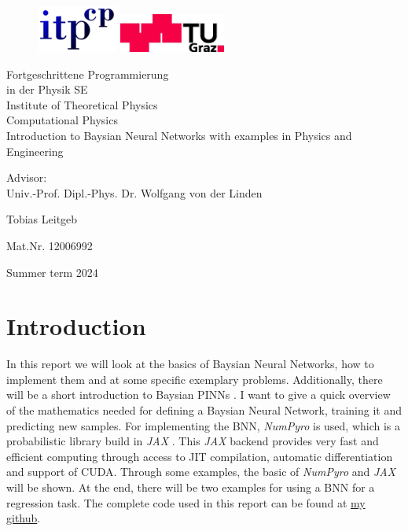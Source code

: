 \documentclass{article}
\newcommand{\bacc}{ Fortgeschrittene Programmierung \\ in der Physik SE}
\begin{document}
\begin{titlepage}
    \begin{figure}
    \includegraphics[width=3.cm]{logo-itp.png} \hfill
    \includegraphics[width=3.5cm]{logo-tu.png} \par
    \end{figure}
    
    \begin{center}
    {\huge\sc \bacc} \\ Institute of Theoretical Physics\\
    Computational Physics\\
    
    \vspace{5cm}
    {\huge\sc Introduction to Baysian Neural Networks with examples in Physics and Engineering} \par
    Advisor: \\ Univ.-Prof. Dipl.-Phys. Dr. Wolfgang von der Linden \\ 
    \vspace{5cm}
    
    {\Large\sc Tobias Leitgeb}
    
    {Mat.Nr. 12006992}
    
    \vspace{3cm}
    Summer term 2024
    \end{center}
    \end{titlepage}
\section{Introduction}
In this report we will look at the basics of Baysian Neural Networks, how to implement them and at some specific exemplary problems. Additionally, there will be a short introduction to Baysian PINNs \cite{Yang_2021}. I want to give a quick overview of the mathematics needed for defining a Baysian Neural Network, training it and predicting new samples. For implementing the BNN, \textit{NumPyro} \cite{bingham2019pyro, phan2019composable} is used, which is a probabilistic library build in \textit{JAX} \cite{jax2018github}. This \textit{JAX} backend provides very fast and efficient computing through access to JIT compilation, automatic differentiation and support of CUDA. Through some examples, the basic of \textit{NumPyro} and \textit{JAX} will be shown. At the end, there will be two examples for using a BNN for a regression task. The complete code used in this report can be found at \href{https://github.com/TobiLeitgeb/BNN_project}{my github}.
\end{document}
